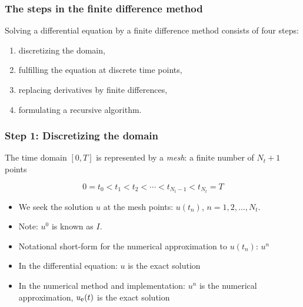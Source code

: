 \documentclass{beamer}
\begin{document}
\begin{frame}
\frametitle{The steps in the finite difference method}

\label{decay:schemes:keysteps}

Solving a differential equation by a finite difference method
consists of four steps:

\begin{enumerate}
\item discretizing the domain,

\item fulfilling the equation at discrete time points,

\item replacing derivatives by finite differences,

\item formulating a recursive algorithm.
\end{enumerate}

\noindent
\end{frame}

\begin{frame}
\frametitle{Step 1: Discretizing the domain}

 


The time domain $[0,T]$ is represented by a \emph{mesh}: a finite number of
$N_t+1$ points

\[0 = t_0 < t_1 < t_2 < \cdots < t_{N_t-1} < t_{N_t} = T\]


\begin{itemize}
 \item We seek the solution $u$ at the mesh points: $u(t_n)$, $n=1,2,\ldots,N_t$.

 \item Note: $u^0$ is known as $I$.

 \item Notational short-form for the numerical approximation to $u(t_n)$: $u^n$

 \item In the differential equation: $u$ is the exact solution

 \item In the numerical method and implementation: $u^n$ is the numerical
   approximation, $\uex(t)$ is the exact solution
\end{itemize}

\noindent
\end{frame}
\end{document}
